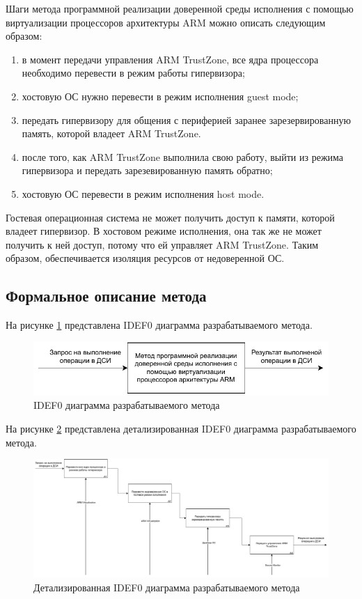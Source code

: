 Шаги метода программной реализации доверенной среды исполнения с помощью виртуализации процессоров архитектуры ARM можно описать следующим образом:

\begin{enumerate}
	\item в момент передачи управления ARM TrustZone, все ядра процессора необходимо перевести в режим работы гипервизора;
	\item хостовую ОС нужно перевести в режим исполнения guest mode;
	\item передать гипервизору для общения с периферией заранее зарезервированную память, которой владеет ARM TrustZone.
	\item после того, как ARM TrustZone выполнила свою работу, выйти из режима гипервизора и передать зарезевированную память обратно;
	\item хостовую ОС перевести в режим исполнения host mode.
\end{enumerate}

Гостевая операционная система не может получить доступ к памяти, которой владеет гипервизор. В хостовом режиме исполнения, она так же не может получить к ней доступ, потому что ей управляет ARM TrustZone. Таким образом, обеспечивается изоляция ресурсов от недоверенной ОС.

\subsection{Формальное описание метода}

На рисунке \ref{fig:idef0-0} представлена IDEF0 диаграмма разрабатываемого метода.

\begin{figure}[h]
	\centering
	\includegraphics[width=\textwidth]{img/idef0-0.pdf}
	\caption{IDEF0 диаграмма разрабатываемого метода}
	\label{fig:idef0-0}
\end{figure}

На рисунке \ref{fig:idef0-1} представлена детализированная IDEF0 диаграмма разрабатываемого метода.

\begin{figure}[h]
	\centering
	\includegraphics[width=\textwidth]{img/idef0-1.pdf}
	\caption{Детализированная IDEF0 диаграмма разрабатываемого метода}
	\label{fig:idef0-1}
\end{figure}


